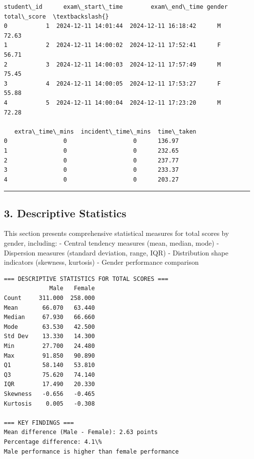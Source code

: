 \documentclass[11pt]{article}
\begin{document}
            \begin{tcolorbox}[breakable, size=fbox, boxrule=.5pt, pad at break*=1mm, opacityfill=0]
\begin{Verbatim}[commandchars=\\\{\}]
   student\_id      exam\_start\_time        exam\_end\_time gender  total\_score  \textbackslash{}
0           1  2024-12-11 14:01:44  2024-12-11 16:18:42      M        72.63
1           2  2024-12-11 14:00:02  2024-12-11 17:52:41      F        56.71
2           3  2024-12-11 14:00:03  2024-12-11 17:57:49      M        75.45
3           4  2024-12-11 14:00:05  2024-12-11 17:53:27      F        55.88
4           5  2024-12-11 14:00:04  2024-12-11 17:23:20      M        72.28

   extra\_time\_mins  incident\_time\_mins  time\_taken
0                0                   0      136.97
1                0                   0      232.65
2                0                   0      237.77
3                0                   0      233.37
4                0                   0      203.27
\end{Verbatim}
\end{tcolorbox}
        
    \begin{center}\rule{0.5\linewidth}{0.5pt}\end{center}

    \subsection{3. Descriptive Statistics}\label{descriptive-statistics}

This section presents comprehensive statistical measures for total
scores by gender, including: - Central tendency measures (mean, median,
mode) - Dispersion measures (standard deviation, range, IQR) -
Distribution shape indicators (skewness, kurtosis) - Gender performance
comparison

    \begin{Verbatim}[commandchars=\\\{\}]
=== DESCRIPTIVE STATISTICS FOR TOTAL SCORES ===
             Male   Female
Count     311.000  258.000
Mean       66.070   63.440
Median     67.930   66.660
Mode       63.530   42.500
Std Dev    13.330   14.300
Min        27.700   24.480
Max        91.850   90.890
Q1         58.140   53.810
Q3         75.620   74.140
IQR        17.490   20.330
Skewness   -0.656   -0.465
Kurtosis    0.005   -0.308

=== KEY FINDINGS ===
Mean difference (Male - Female): 2.63 points
Percentage difference: 4.1\%
Male performance is higher than female performance
    \end{Verbatim}
\end{document}
